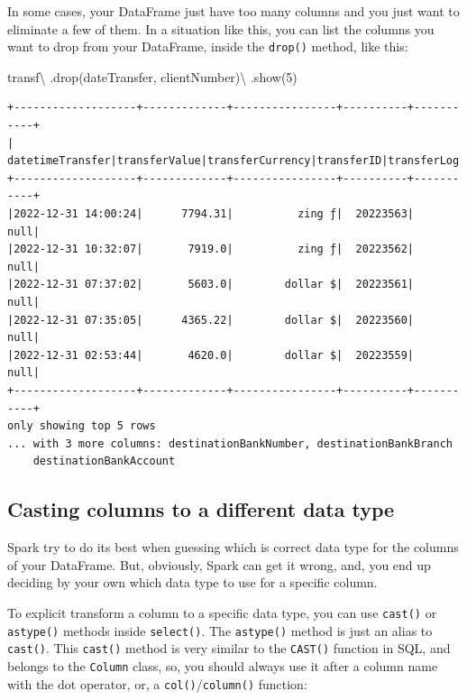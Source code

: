 \documentclass[
  11pt,
  letterpaper,
  DIV=11,
  numbers=noendperiod]{scrreprt}
\newenvironment{Shaded}{\begin{snugshade}}{\end{snugshade}}
\newcommand{\DecValTok}[1]{\textcolor[rgb]{0.68,0.00,0.00}{#1}}
\newcommand{\NormalTok}[1]{\textcolor[rgb]{0.00,0.23,0.31}{#1}}
\newcommand{\OperatorTok}[1]{\textcolor[rgb]{0.37,0.37,0.37}{#1}}
\newcommand{\StringTok}[1]{\textcolor[rgb]{0.13,0.47,0.30}{#1}}
\begin{document}
In some cases, your DataFrame just have too many columns and you just
want to eliminate a few of them. In a situation like this, you can list
the columns you want to drop from your DataFrame, inside the
\texttt{drop()} method, like this:

\begin{Shaded}
\begin{Highlighting}[]
\NormalTok{transf}\OperatorTok{\textbackslash{}}
\NormalTok{  .drop(}\StringTok{\textquotesingle{}dateTransfer\textquotesingle{}}\NormalTok{, }\StringTok{\textquotesingle{}clientNumber\textquotesingle{}}\NormalTok{)}\OperatorTok{\textbackslash{}}
\NormalTok{  .show(}\DecValTok{5}\NormalTok{)}
\end{Highlighting}
\end{Shaded}

\begin{verbatim}
+-------------------+-------------+----------------+----------+-----------+
|   datetimeTransfer|transferValue|transferCurrency|transferID|transferLog|
+-------------------+-------------+----------------+----------+-----------+
|2022-12-31 14:00:24|      7794.31|          zing ƒ|  20223563|       null|
|2022-12-31 10:32:07|       7919.0|          zing ƒ|  20223562|       null|
|2022-12-31 07:37:02|       5603.0|        dollar $|  20223561|       null|
|2022-12-31 07:35:05|      4365.22|        dollar $|  20223560|       null|
|2022-12-31 02:53:44|       4620.0|        dollar $|  20223559|       null|
+-------------------+-------------+----------------+----------+-----------+
only showing top 5 rows
... with 3 more columns: destinationBankNumber, destinationBankBranch
    destinationBankAccount
\end{verbatim}

\hypertarget{casting-columns-to-a-different-data-type}{%
\subsection{Casting columns to a different data
type}\label{casting-columns-to-a-different-data-type}}

Spark try to do its best when guessing which is correct data type for
the columns of your DataFrame. But, obviously, Spark can get it wrong,
and, you end up deciding by your own which data type to use for a
specific column.

To explicit transform a column to a specific data type, you can use
\texttt{cast()} or \texttt{astype()} methods inside \texttt{select()}.
The \texttt{astype()} method is just an alias to \texttt{cast()}. This
\texttt{cast()} method is very similar to the \texttt{CAST()} function
in SQL, and belongs to the \texttt{Column} class, so, you should always
use it after a column name with the dot operator, or, a
\texttt{col()}/\texttt{column()} function:
\end{document}
